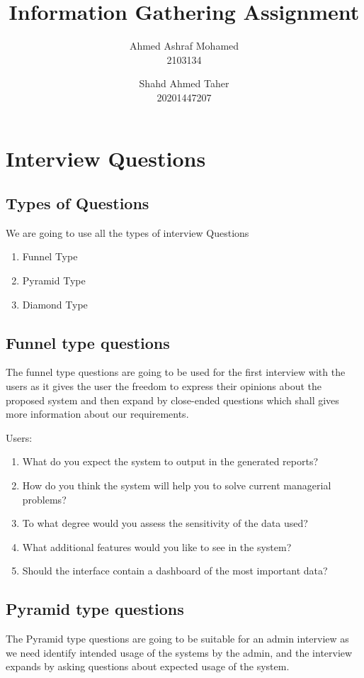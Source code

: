 \documentclass{article}
\title{Information Gathering Assignment}
\author{Ahmed Ashraf Mohamed\\2103134 \and Shahd Ahmed Taher\\20201447207}
\date{}
\begin{document}
\maketitle
\tableofcontents
\section{Interview Questions}
\subsection{Types of Questions}
We are going to use all the types of interview Questions
\begin{enumerate}
    \item Funnel Type
    \item Pyramid Type
    \item Diamond Type
\end{enumerate}
\subsection{Funnel type questions}
The funnel type questions are going to be used for the first interview with the users as it gives the user the freedom to express their opinions about the proposed system and then expand by close-ended questions which shall gives more
information about our requirements.

Users:
\begin{enumerate}
    \item What do you expect the system to output in the generated reports?
    \item How do you think the system will help you to solve current managerial problems?
    \item To what degree would you assess the sensitivity of the data used?
    \item What additional features would you like to see in the system?
    \item Should the interface contain a dashboard of the most important data?
\end{enumerate}
\subsection{Pyramid type questions}
The Pyramid type questions are going to be suitable for an admin interview as we need identify intended usage of the systems by the admin, and the interview expands by asking questions about  expected usage of the system.
\end{document}
